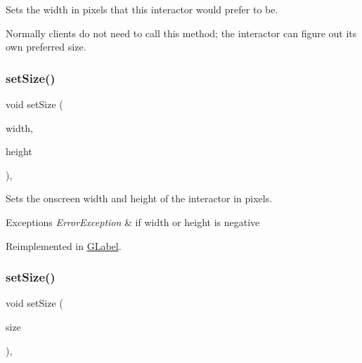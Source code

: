 Sets the width in pixels that this interactor would prefer to be. 

Normally clients do not need to call this method; the interactor can figure out its own preferred size. \mbox{\label{classGInteractor_aca25d49481f9bf5fc8f7df4c086c4ce7}} 
\subsubsection{\texorpdfstring{set\+Size()}{setSize()}\hspace{0.1cm}{\footnotesize\ttfamily [1/2]}}
{\footnotesize\ttfamily void set\+Size (\begin{DoxyParamCaption}\item[{double}]{width,  }\item[{double}]{height }\end{DoxyParamCaption})\hspace{0.3cm}{\ttfamily [virtual]}, {\ttfamily [inherited]}}



Sets the onscreen width and height of the interactor in pixels. 


\begin{DoxyExceptions}{Exceptions}
{\em Error\+Exception} & if width or height is negative \\
\hline
\end{DoxyExceptions}


Reimplemented in \mbox{\hyperlink{classGLabel_a8ba9af72c23f52d4b93096a13a11f150}{G\+Label}}.

\mbox{\label{classGInteractor_ae2b628228f192c2702c4ce941b2af68f}} 
\subsubsection{\texorpdfstring{set\+Size()}{setSize()}\hspace{0.1cm}{\footnotesize\ttfamily [2/2]}}
{\footnotesize\ttfamily void set\+Size (\begin{DoxyParamCaption}\item[{const \mbox{\hyperlink{structGDimension}{G\+Dimension}} \&}]{size }\end{DoxyParamCaption})\hspace{0.3cm}{\ttfamily [virtual]}, {\ttfamily [inherited]}}



